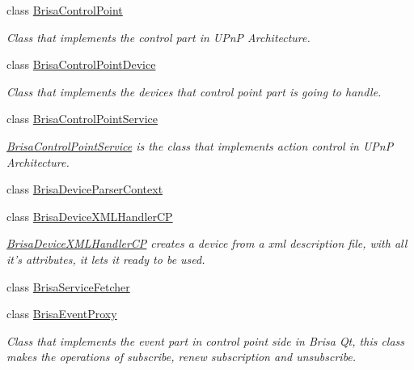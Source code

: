 \begin{DoxyCompactItemize}
class \hyperlink{classBrisaUpnp_1_1BrisaControlPoint}{BrisaControlPoint}
\begin{DoxyCompactList}\small\item\em Class that implements the control part in UPnP Architecture. \item\end{DoxyCompactList}\item 
class \hyperlink{classBrisaUpnp_1_1BrisaControlPointDevice}{BrisaControlPointDevice}
\begin{DoxyCompactList}\small\item\em Class that implements the devices that control point part is going to handle. \item\end{DoxyCompactList}\item 
class \hyperlink{classBrisaUpnp_1_1BrisaControlPointService}{BrisaControlPointService}
\begin{DoxyCompactList}\small\item\em \hyperlink{classBrisaUpnp_1_1BrisaControlPointService}{BrisaControlPointService} is the class that implements action control in UPnP Architecture. \item\end{DoxyCompactList}\item 
class \hyperlink{classBrisaUpnp_1_1BrisaDeviceParserContext}{BrisaDeviceParserContext}
\item 
class \hyperlink{classBrisaUpnp_1_1BrisaDeviceXMLHandlerCP}{BrisaDeviceXMLHandlerCP}
\begin{DoxyCompactList}\small\item\em \hyperlink{classBrisaUpnp_1_1BrisaDeviceXMLHandlerCP}{BrisaDeviceXMLHandlerCP} creates a device from a xml description file, with all it's attributes, it lets it ready to be used. \item\end{DoxyCompactList}\item 
class \hyperlink{classBrisaUpnp_1_1BrisaServiceFetcher}{BrisaServiceFetcher}
\item 
class \hyperlink{classBrisaUpnp_1_1BrisaEventProxy}{BrisaEventProxy}
\begin{DoxyCompactList}\small\item\em Class that implements the event part in control point side in Brisa Qt, this class makes the operations of subscribe, renew subscription and unsubscribe. \item\end{DoxyCompactList}\item 

\end{DoxyCompactItemize}
